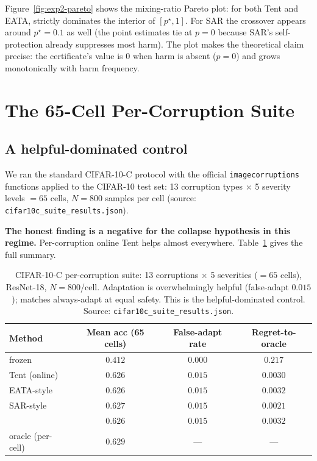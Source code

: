 Figure~\ref{fig:exp2-pareto} shows the mixing-ratio Pareto plot: for both Tent and EATA,
\KGA{} strictly dominates the interior of $[p^\star, 1]$.  For SAR the crossover appears
around $p^\star{=}0.1$ as well (the point estimates tie at $p{=}0$ because SAR's self-protection
already suppresses most harm).  The plot makes the theoretical claim precise: the
certificate's value is $0$ when harm is absent ($p{=}0$) and grows monotonically with
harm frequency.

\section{The 65-Cell Per-Corruption Suite}\label{sec:exp2-c10c}

\subsection{A helpful-dominated control}\label{sec:exp2-c10c-finding}

We ran the standard CIFAR-10-C protocol with the official \texttt{imagecorruptions}
functions applied to the CIFAR-10 test set: 13 corruption types $\times$ 5 severity
levels $= 65$ cells, $N{=}800$ samples per cell (source:
\texttt{cifar10c\_suite\_results.json}).

\textbf{The honest finding is a negative for the collapse hypothesis in this regime.}
Per-corruption online Tent helps almost everywhere.  Table~\ref{tab:exp2-c10c} gives
the full summary.

\begin{table}[ht]
\centering
\small
\caption{CIFAR-10-C per-corruption suite: 13 corruptions $\times$ 5 severities ($=65$
cells), ResNet-18, $N{=}800$/cell.  Adaptation is overwhelmingly helpful (false-adapt
$0.015$); \KGA{} matches always-adapt at equal safety.  This is the helpful-dominated
control.  Source: \texttt{cifar10c\_suite\_results.json}.}
\label{tab:exp2-c10c}
\begin{tabular}{lccc}
\toprule
Method & Mean acc (65 cells) & False-adapt rate & Regret-to-oracle \\
\midrule
frozen               & $0.412$ & $0.000$ & $0.217$ \\
Tent (online)        & $0.626$ & $0.015$ & $0.0030$ \\
EATA-style           & $0.626$ & $0.015$ & $0.0032$ \\
SAR-style            & $0.627$ & $0.015$ & $0.0021$ \\
\textbf{\KGA{}}      & $0.626$ & $0.015$ & $0.0032$ \\
oracle (per-cell)    & $0.629$ & ---     & --- \\
\bottomrule
\end{tabular}
\end{table}

